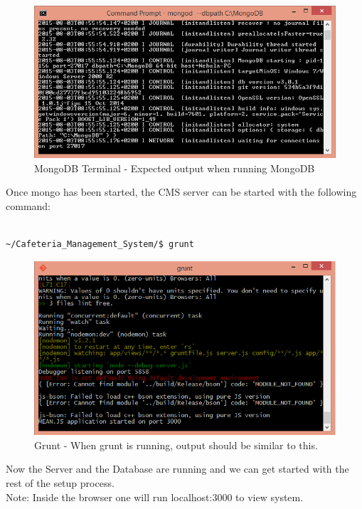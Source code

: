 \documentclass[a4paper,12pt]{report}
\begin{document}
\begin{figure}[H]
  \centering
    \includegraphics[width=1.0\textwidth]{screenshots/MongoDB.png}
    \caption{MongoDB Terminal - Expected output when running MongoDB} 
\end{figure}

Once mongo has been started, the CMS server can be started with the following command:\\ \\

\begin{verbatim}
~/Cafeteria_Management_System/$ grunt
\end{verbatim}

\begin{figure}[H]
  \centering
    \includegraphics[width=1.0\textwidth]{screenshots/gruntOutput.png}
    \caption{Grunt - When grunt is running, output should be similar to this.} 
\end{figure}

Now the Server and the Database are running and we can get started with the rest of the setup process. \\
Note: Inside the browser one will run localhost:3000 to view system. \\ 
\end{document}
